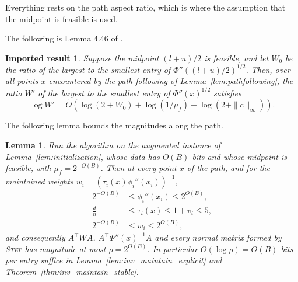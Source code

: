 \documentclass[11pt]{article}
\newtheorem{lemma}{Lemma}[section]
\newtheorem{importedresult}{Imported result}[section]
\renewcommand{\O}{\widetilde O}
\begin{document}
Everything rests on the path aspect ratio, which is where the assumption that
the midpoint is feasible is used.

The following is Lemma 4.46 of
\cite{BLLSSSW21}.

\begin{importedresult}
\label{imp:aspect}
Suppose the midpoint $(l + u) / 2$ is feasible, and let
$W_0$ be the ratio of the largest to the smallest entry of
$\Phi''((l + u) / 2)^{1/2}$.
Then, over all points $x$ encountered by the path following of
Lemma~\ref{lem:pathfollowing}, the ratio $W'$ of the largest to the smallest
entry of $\Phi''(x)^{1/2}$ satisfies
\[
\log W'
=
\O\left(
\log (2 + W_0) + \log(1 / \mu_f) + \log (2 + \|c\|_{\infty})
\right).
\]
\end{importedresult}

The following lemma bounds the magnitudes along the path.

\begin{lemma}
\label{lem:magnitudes}
Run the algorithm on the augmented instance of Lemma~\ref{lem:initialization},
whose data has $O(B)$ bits and whose midpoint is feasible, with
$\mu_f = 2^{-O(B)}$.
Then at every point $x$ of the path, and for the maintained weights
$w_i = (\tau_i(x) \phi_i''(x_i))^{-1}$,
\[
\begin{aligned}
2^{-O(B)}
&\le
\phi_i''(x_i) \le 2^{O(B)},
\\
\frac{d}{n}
&\le
\tau_i(x) \le 1 + v_i \le 5,
\\
2^{-O(B)}
&\le
w_i \le 2^{O(B)},
\end{aligned}
\]
and consequently $A^\top W A$,
$A^\top \Phi''(x)^{-1} A$ and every normal matrix formed by \textsc{Step} has
magnitude at most $\rho = 2^{O(B)}$.
In particular $O(\log \rho) = O(B)$ bits per entry suffice in
Lemma~\ref{lem:inv_maintain_explicit} and Theorem~\ref{thm:inv_maintain_stable}.
\end{lemma}
\end{document}
